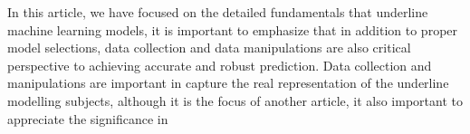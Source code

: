 
\par
In this article, we have focused on the detailed fundamentals that underline machine learning models, it is important to emphasize that in addition to proper model selections, data collection and data manipulations are also critical perspective to achieving accurate and robust prediction. Data collection and manipulations are important in capture the real representation of the underline modelling subjects, although it is the focus of another article, it also important to appreciate the significance in 
\par 
